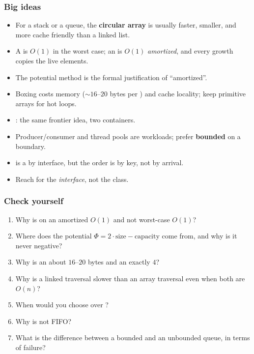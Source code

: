 \documentclass[aspectratio=169,10pt,compress]{beamer}
\begin{document}




\begin{frame}[t,fragile] \frametitle{Big ideas}
  \begin{itemize}
    \item For a stack or a queue, the \textbf{circular array} is
          usually faster, smaller, and more cache friendly than a
          linked list.
    \item A  is $O(1)$ in the worst case; an
           is $O(1)$ \emph{amortized}, and every
          growth copies the live elements.
    \item The potential method is the formal justification of ``amortized''.
    \item Boxing costs memory ($\sim 16$--$20$ bytes per )
          and cache locality; keep primitive arrays for hot loops.
    \item {}: the same
          frontier idea, two containers.
    \item Producer/consumer and thread pools are 
          workloads; prefer \textbf{bounded} on a boundary.
    \item {} is a  by interface, but the
          order is by key, not by arrival.
    \item Reach for the \emph{interface}, not the class.
  \end{itemize}
\end{frame}




\begin{frame}[t,fragile] \frametitle{Check yourself}
  \begin{enumerate}\small
    \item Why is  on an  amortized
          $O(1)$ and not worst-case $O(1)$?
    \item Where does the potential $\Phi = 2 \cdot \text{size} - \text{capacity}$
          come from, and why is it never negative?
    \item Why is an  about $16$--$20$ bytes and an
           exactly $4$?
    \item Why is a linked traversal slower than an array traversal
          even when both are $O(n)$?
    \item When would you choose  over ?
    \item Why is  not FIFO?
    \item What is the difference between a bounded and an unbounded queue,
          in terms of failure?
  \end{enumerate}
\end{frame}
\end{document}
